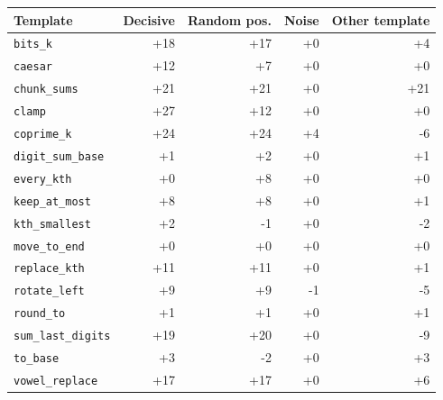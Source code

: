 \begin{tabular}{lrrrr}
\toprule
Template & Decisive & Random pos. & Noise & Other template \\
\midrule
\texttt{bits\_k} & +18 & +17 & +0 & +4 \\
\texttt{caesar} & +12 & +7 & +0 & +0 \\
\texttt{chunk\_sums} & +21 & +21 & +0 & +21 \\
\texttt{clamp} & +27 & +12 & +0 & +0 \\
\texttt{coprime\_k} & +24 & +24 & +4 & -6 \\
\texttt{digit\_sum\_base} & +1 & +2 & +0 & +1 \\
\texttt{every\_kth} & +0 & +8 & +0 & +0 \\
\texttt{keep\_at\_most} & +8 & +8 & +0 & +1 \\
\texttt{kth\_smallest} & +2 & -1 & +0 & -2 \\
\texttt{move\_to\_end} & +0 & +0 & +0 & +0 \\
\texttt{replace\_kth} & +11 & +11 & +0 & +1 \\
\texttt{rotate\_left} & +9 & +9 & -1 & -5 \\
\texttt{round\_to} & +1 & +1 & +0 & +1 \\
\texttt{sum\_last\_digits} & +19 & +20 & +0 & -9 \\
\texttt{to\_base} & +3 & -2 & +0 & +3 \\
\texttt{vowel\_replace} & +17 & +17 & +0 & +6 \\
\bottomrule
\end{tabular}

